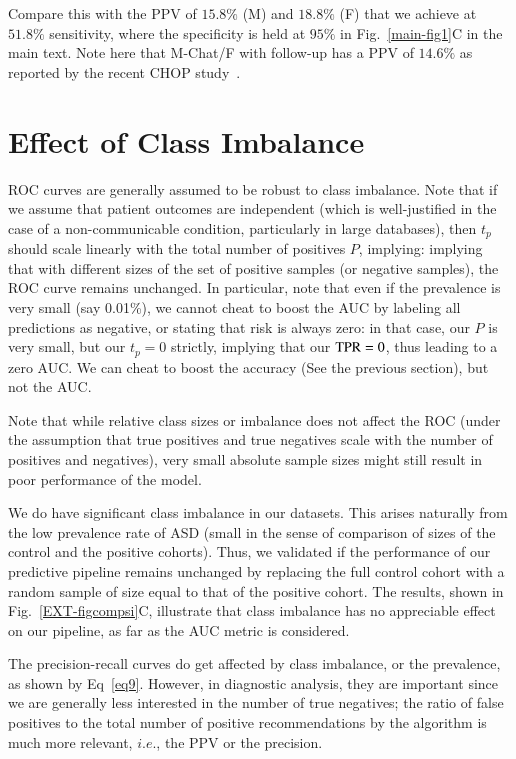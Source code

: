 \documentclass[3p,super,numbers,sort&compress,preprint,10pt]{elsarticle}
\gdef\treatment{positive\xspace}
\begin{document}
Compare this with the PPV of $15.8 \%$ (M) and $18.8 \%$ (F) that we achieve at $51.8\%$ sensitivity, where the specificity is held at $95\%$ in Fig.~\ref{main-fig1}C in the main text. Note here that M-Chat/F with follow-up has a PPV of $14.6\%$ as reported by the recent CHOP study~\cite{pmid31562252}.
%


\section{Effect of Class Imbalance}\label{subsec:classimbalance}
ROC curves are generally assumed to be robust to
class imbalance.
Note that if we assume that patient outcomes are independent (which is well-justified in  the case of a non-communicable condition, particularly in large
databases), then $t_p$ should scale linearly with the total number of positives $P$, implying:
%
  implying that with different sizes of the set of positive samples (or negative samples), the ROC curve remains unchanged. In particular, note that even if the prevalence is very small (say 0.01\%), we cannot cheat to boost the AUC by labeling all predictions as negative, or stating that risk is always zero: in that case, our $P$ is very small, but our $t_p=0$ strictly, implying that our $\textrm{TPR}=0$, thus leading to a zero AUC. We can cheat to boost the accuracy (See the previous section), but not the AUC.


  Note that while relative class sizes or imbalance does not affect the ROC (under the assumption that true positives and true negatives scale with the number of positives and negatives), very small absolute sample sizes might still
  result in poor performance of the model.

We do have significant class imbalance in our datasets. This arises naturally from the low prevalence rate of ASD (small in the sense of comparison of sizes of the control and the \treatment  cohorts). Thus, we validated if the performance of our predictive pipeline remains unchanged by replacing  the full control cohort with a random sample of size equal to that of the \treatment cohort. The results, shown in Fig.~\ref{EXT-figcompsi}C, illustrate that class imbalance has no appreciable effect on our pipeline, as far as the AUC metric is considered.

 The precision-recall curves do get affected by class imbalance, or the prevalence, as shown by Eq~\eqref{eq9}. 
 However, in diagnostic analysis, they are important since we are generally less interested in the number of true negatives; the ratio of false positives to the total number of positive recommendations by the algorithm is much more relevant, $i.e.$, the PPV or the precision.
\end{document}
